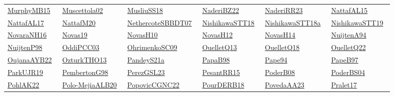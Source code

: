 \begin{longtable}{*{6}{l}}
\href{works/MurphyMB15.pdf}{MurphyMB15}~\cite{MurphyMB15} & \href{works/Muscettola02.pdf}{Muscettola02}~\cite{Muscettola02} & \href{works/MusliuSS18.pdf}{MusliuSS18}~\cite{MusliuSS18} & \href{works/NaderiBZ22.pdf}{NaderiBZ22}~\cite{NaderiBZ22} & \href{works/NaderiRR23.pdf}{NaderiRR23}~\cite{NaderiRR23} & \href{works/NattafAL15.pdf}{NattafAL15}~\cite{NattafAL15}\\ 
\href{works/NattafAL17.pdf}{NattafAL17}~\cite{NattafAL17} & \href{works/NattafM20.pdf}{NattafM20}~\cite{NattafM20} & \href{works/NethercoteSBBDT07.pdf}{NethercoteSBBDT07}~\cite{NethercoteSBBDT07} & \href{works/NishikawaSTT18.pdf}{NishikawaSTT18}~\cite{NishikawaSTT18} & \href{works/NishikawaSTT18a.pdf}{NishikawaSTT18a}~\cite{NishikawaSTT18a} & \href{works/NishikawaSTT19.pdf}{NishikawaSTT19}~\cite{NishikawaSTT19}\\ 
\href{works/NovaraNH16.pdf}{NovaraNH16}~\cite{NovaraNH16} & \href{works/Novas19.pdf}{Novas19}~\cite{Novas19} & \href{works/NovasH10.pdf}{NovasH10}~\cite{NovasH10} & \href{works/NovasH12.pdf}{NovasH12}~\cite{NovasH12} & \href{works/NovasH14.pdf}{NovasH14}~\cite{NovasH14} & \href{works/NuijtenA94.pdf}{NuijtenA94}~\cite{NuijtenA94}\\ 
\href{works/NuijtenP98.pdf}{NuijtenP98}~\cite{NuijtenP98} & \href{works/OddiPCC03.pdf}{OddiPCC03}~\cite{OddiPCC03} & \href{works/OhrimenkoSC09.pdf}{OhrimenkoSC09}~\cite{OhrimenkoSC09} & \href{works/OuelletQ13.pdf}{OuelletQ13}~\cite{OuelletQ13} & \href{works/OuelletQ18.pdf}{OuelletQ18}~\cite{OuelletQ18} & \href{works/OuelletQ22.pdf}{OuelletQ22}~\cite{OuelletQ22}\\ 
\href{works/OujanaAYB22.pdf}{OujanaAYB22}~\cite{OujanaAYB22} & \href{works/OzturkTHO13.pdf}{OzturkTHO13}~\cite{OzturkTHO13} & \href{works/PandeyS21a.pdf}{PandeyS21a}~\cite{PandeyS21a} & \href{works/PapaB98.pdf}{PapaB98}~\cite{PapaB98} & \href{}{Pape94}~\cite{Pape94} & \href{}{PapeB97}~\cite{PapeB97}\\ 
\href{works/ParkUJR19.pdf}{ParkUJR19}~\cite{ParkUJR19} & \href{works/PembertonG98.pdf}{PembertonG98}~\cite{PembertonG98} & \href{works/PerezGSL23.pdf}{PerezGSL23}~\cite{PerezGSL23} & \href{works/PesantRR15.pdf}{PesantRR15}~\cite{PesantRR15} & \href{works/PoderB08.pdf}{PoderB08}~\cite{PoderB08} & \href{works/PoderBS04.pdf}{PoderBS04}~\cite{PoderBS04}\\ 
\href{works/PohlAK22.pdf}{PohlAK22}~\cite{PohlAK22} & \href{works/Polo-MejiaALB20.pdf}{Polo-MejiaALB20}~\cite{Polo-MejiaALB20} & \href{works/PopovicCGNC22.pdf}{PopovicCGNC22}~\cite{PopovicCGNC22} & \href{works/PourDERB18.pdf}{PourDERB18}~\cite{PourDERB18} & \href{works/PovedaAA23.pdf}{PovedaAA23}~\cite{PovedaAA23} & \href{works/Pralet17.pdf}{Pralet17}~\cite{Pralet17}\\ 

\end{longtable}
